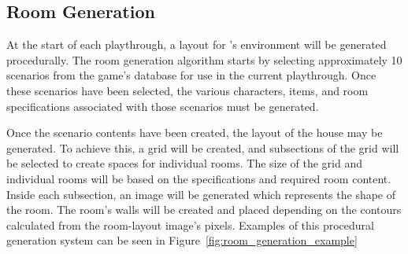 \subsection{Room Generation}
At the start of each playthrough, a layout for \ourgame{}'s environment will be generated procedurally. The room generation algorithm starts by selecting approximately 10 scenarios from the game's database for use in the current playthrough. Once these scenarios have been selected, the various characters, items, and room specifications associated with those scenarios must be generated.

Once the scenario contents have been created, the layout of the house may be generated. To achieve this, a grid will be created, and subsections of the grid will be selected to create spaces for individual rooms. The size of the grid and individual rooms will be based on the specifications and required room content. Inside each subsection, an image will be generated which represents the shape of the room. The room's walls will be created and placed depending on the contours calculated from the room-layout image's pixels. Examples of this procedural generation system can be seen in Figure~\ref{fig:room_generation_example}

